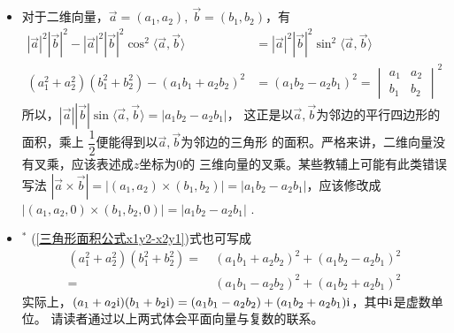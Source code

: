 \begin{itemize}[leftmargin=\inteval{\myitemleftmargin}pt,itemsep=
   \inteval{\myitemitempsep}pt,topsep=\inteval{\myitemtopsep}pt]
\item 对于二维向量，$ \vec{a}=(a_1,a_2),\ \vec{b}=(b_1,b_2) $，有
\begin{align}
    |\vec{a}|^2|\vec{b}|^2-|\vec{a}|^2|\vec{b}|^2
    \cos^2\langle\vec{a},\vec{b}\rangle 
    &=|\vec{a}|^2|\vec{b}|^2\sin^2\langle\vec{a},\vec{b}\rangle \nonumber\\
    (a_1^2+a_2^2)(b_1^2+b_2^2)-(a_1b_1+a_2b_2)^2 &=
    (a_1b_2-a_2b_1)^2=
    \begin{vmatrix}
        a_{1} & a_{2} \\
        b_{1} & b_{2}
    \end{vmatrix}
    ^2 \label{三角形面积公式x1y2-x2y1}
\end{align}
所以，$ |\vec{a}||\vec{b}|\sin\langle\vec{a},\vec{b}
\rangle=|a_1b_2-a_2b_1| $，
这正是以$ \vec{a},\vec{b} $为邻边的平行四边形的面积，乘上
$ \dfrac{1}{2} $便能得到以$ \vec{a},\vec{b} $为邻边的三角形
的面积。严格来讲，二维向量没有叉乘，应该表述成$ z $坐标为0的
三维向量的叉乘。某些教辅上可能有此类错误写法
$ |\vec{a}\times\vec{b}|=|(a_1,a_2)\times (b_1,b_2)|=
|a_1b_2-a_2b_1| $，应该修改成
$ |(a_1,a_2,0)\times (b_1,b_2,0)|=|a_1b_2-a_2b_1| $ . 

\item $^*$ (\ref{三角形面积公式x1y2-x2y1})式也可写成
\begin{align} 
    (a_1^2+a_2^2)(b_1^2+b_2^2)=&\  (a_1b_1+a_2b_2)^2+
    (a_1b_2-a_2b_1)^2 \\
    =&\  (a_1b_1-a_2b_2)^2+(a_1b_2+a_2b_1)^2 
\end{align}
实际上，$ (a_1+a_2 \mathrm{i})(b_1+b_2 \mathrm{i})=(a_1b_1-a_2b_2)+(a_1b_2+
a_2b_1)\mathrm{i} $，其中$ \mathrm{i} $是虚数单位。
请读者通过以上两式体会平面向量与复数的联系。


\end{itemize}

